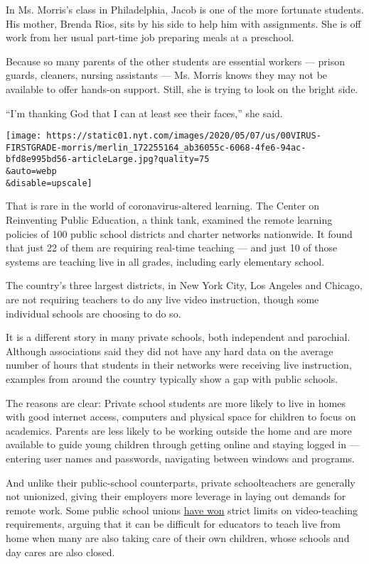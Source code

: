 In Ms. Morris's class in Philadelphia, Jacob is one of the more
fortunate students. His mother, Brenda Rios, sits by his side to help
him with assignments. She is off work from her usual part-time job
preparing meals at a preschool.

Because so many parents of the other students are essential workers ---
prison guards, cleaners, nursing assistants --- Ms. Morris knows they
may not be available to offer hands-on support. Still, she is trying to
look on the bright side.

``I'm thanking God that I can at least see their faces,'' she said.

\texttt{[image: https://static01.nyt.com/images/2020/05/07/us/00VIRUS-FIRSTGRADE-morris/merlin\_172255164\_ab36055c-6068-4fe6-94ac-bfd8e995bd56-articleLarge.jpg?quality=75\\\&auto=webp\\\&disable=upscale]}

That is rare in the world of coronavirus-altered learning. The Center on
Reinventing Public Education, a think tank, examined the remote learning
policies of 100 public school districts and charter networks nationwide.
It found that just 22 of them are requiring real-time teaching --- and
just 10 of those systems are teaching live in all grades, including
early elementary school.

The country's three largest districts, in New York City, Los Angeles and
Chicago, are not requiring teachers to do any live video instruction,
though some individual schools are choosing to do so.

It is a different story in many private schools, both independent and
parochial. Although associations said they did not have any hard data on
the average number of hours that students in their networks were
receiving live instruction, examples from around the country typically
show a gap with public schools.

The reasons are clear: Private school students are more likely to live
in homes with good internet access, computers and physical space for
children to focus on academics. Parents are less likely to be working
outside the home and are more available to guide young children through
getting online and staying logged in --- entering user names and
passwords, navigating between windows and programs.

And unlike their public-school counterparts, private schoolteachers are
generally not unionized, giving their employers more leverage in laying
out demands for remote work. Some public school unions
\href{https://www.nytimes.com/2020/04/21/us/coronavirus-teachers-unions-school-home.html}{have
won} strict limits on video-teaching requirements, arguing that it can
be difficult for educators to teach live from home when many are also
taking care of their own children, whose schools and day cares are also
closed.

